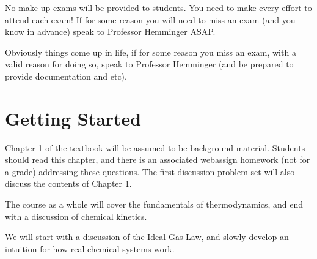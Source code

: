 \documentclass{article}
\begin{document}
No make-up exams will be provided to students. 
You need to make every effort to attend each exam!
If for some reason you will need to miss an exam (and you know in advance) speak to Professor Hemminger ASAP.

Obviously things come up in life, if for some reason you miss an exam, with a valid reason for doing so, speak to Professor Hemminger (and be prepared to provide documentation and etc). 

\section*{Getting Started}
Chapter 1 of the textbook will be assumed to be background material.
Students should read this chapter, and there is an associated webassign homework (not for a grade) addressing these questions.
The first discussion problem set will also discuss the contents of Chapter 1. 

The course as a whole will cover the fundamentals of thermodynamics, and end with a discussion of chemical kinetics. 

We will start with a discussion of the Ideal Gas Law, and slowly develop an intuition for how real chemical systems work. 
\end{document}

